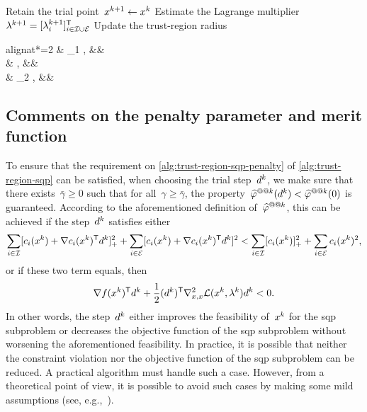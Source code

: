 \begin{algorithm}
{{        }{
            Retain the trial point~$\iter[k + 1] \gets \iter[k]$\;
        }
        Estimate the Lagrange multiplier~$\lm[k + 1] = [\lm[k + 1]_i]_{i \in \iub \cup \ieq}^{\T}$\;
        Update the trust-region radius
        \begin{algoempheq}[left={\rad[k + 1] \gets \empheqlbrace}]{alignat*=2}
            & \theta_1 \rad[k],  && \quad {}\\
            & \rad[k],           && \quad {}\\
            & \theta_2 \rad[k],  && \quad {}
        \end{algoempheq}
    }
\end{algorithm}

\subsection{Comments on the penalty parameter and merit function}
\label{subsec:penalty-parameter-merit-function}

To ensure that the requirement on \cref{alg:trust-region-sqp-penalty} of \cref{alg:trust-region-sqp} can be satisfied, when choosing the trial step~$\step[k]$, we make sure that there exists~$\bar{\gamma} \ge 0$ such that for all~$\gamma \ge \bar{\gamma}$, the property~$\meritm[k](\step[k]) < \meritm[k](0)$ is guaranteed.
According to the aforementioned definition of~$\meritm[k]$, this can be achieved if the step~$\step[k]$ satisfies either
\begin{equation*}
    \sum_{i \in \iub} \posp{\con{i}(\iter[k]) + \nabla \con{i}(\iter[k])^{\T} \step[k]}^2 + \sum_{i \in \ieq} [\con{i}(\iter[k]) + \nabla \con{i}(\iter[k])^{\T} \step[k]]^2 < \sum_{i \in \iub} \posp{\con{i}(\iter[k])}^2 + \sum_{i \in \ieq} \con{i}(\iter[k])^2,
\end{equation*}
or if these two term equals, then
\begin{equation*}
    \nabla \obj(\iter[k])^{\T} \step[k] + \frac{1}{2} (\step[k])^{\T} \nabla_{x, x}^2 \lag(\iter[k], \lm[k]) \step[k] < 0.
\end{equation*}
In other words, the step~$\step[k]$ either improves the feasibility of~$\iter[k]$ for the \gls{sqp} subproblem or decreases the objective function of the \gls{sqp} subproblem without worsening the aforementioned feasibility.
In practice, it is possible that neither the constraint violation nor the objective function of the \gls{sqp} subproblem can be reduced.
A practical algorithm must handle such a case.
However, from a theoretical point of view, it is possible to avoid such cases by making some mild assumptions (see, e.g.,~\cite[Asm.~3.1]{Powell_Yuan_1991}).

